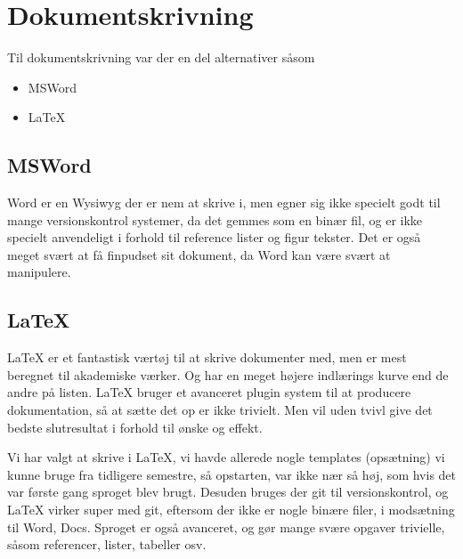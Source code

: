 \section{Dokumentskrivning}

Til dokumentskrivning var der en del alternativer såsom

\begin{itemize}
    \item MSWord
    \item \LaTeX
\end{itemize}

\subsection{MSWord}

Word er en Wysiwyg der er nem at skrive i, men egner sig ikke specielt godt til mange versionskontrol systemer, da det gemmes som en binær fil, og er ikke specielt anvendeligt i forhold til reference lister og figur tekster. Det er også meget svært at få finpudset sit dokument, da Word kan være svært at manipulere.

\subsection{\LaTeX}

LaTeX er et fantastisk værtøj til at skrive dokumenter med, men er mest beregnet til akademiske værker. Og har en meget højere indlærings kurve end de andre på listen. LaTeX bruger et avanceret plugin system til at producere dokumentation, så at sætte det op er ikke trivielt. Men vil uden tvivl give det bedste slutresultat i forhold til ønske og effekt.

Vi har valgt at skrive i LaTeX, vi havde allerede nogle templates (opsætning) vi kunne bruge fra tidligere semestre, så opstarten, var ikke nær så høj, som hvis det var første gang sproget blev brugt. Desuden bruges der git til versionskontrol, og LaTeX virker super med git, eftersom der ikke er nogle binære filer, i modsætning til Word, Docs. Sproget er også avanceret, og gør mange svære opgaver trivielle, såsom referencer, lister, tabeller osv.

